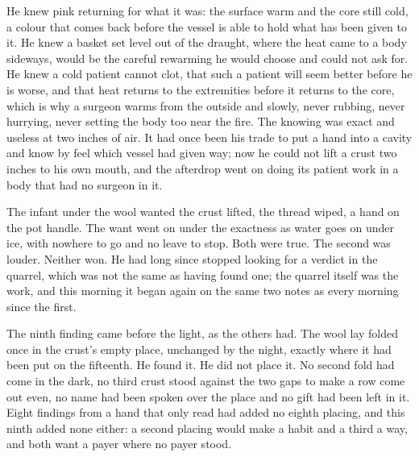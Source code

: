 He knew pink returning for what it was: the surface warm and the core still cold, a colour that comes back before the vessel is able to hold what has been given to it. He knew a basket set level out of the draught, where the heat came to a body sideways, would be the careful rewarming he would choose and could not ask for. He knew a cold patient cannot clot, that such a patient will seem better before he is worse, and that heat returns to the extremities before it returns to the core, which is why a surgeon warms from the outside and slowly, never rubbing, never hurrying, never setting the body too near the fire. The knowing was exact and useless at two inches of air. It had once been his trade to put a hand into a cavity and know by feel which vessel had given way; now he could not lift a crust two inches to his own mouth, and the afterdrop went on doing its patient work in a body that had no surgeon in it.

The infant under the wool wanted the crust lifted, the thread wiped, a hand on the pot handle. The want went on under the exactness as water goes on under ice, with nowhere to go and no leave to stop. Both were true. The second was louder. Neither won. He had long since stopped looking for a verdict in the quarrel, which was not the same as having found one; the quarrel itself was the work, and this morning it began again on the same two notes as every morning since the first.

\scenebreak

The ninth finding came before the light, as the others had. The wool lay folded once in the crust's empty place, unchanged by the night, exactly where it had been put on the fifteenth. He found it. He did not place it. No second fold had come in the dark, no third crust stood against the two gaps to make a row come out even, no name had been spoken over the place and no gift had been left in it. Eight findings from a hand that only read had added no eighth placing, and this ninth added none either: a second placing would make a habit and a third a way, and both want a payer where no payer stood.

